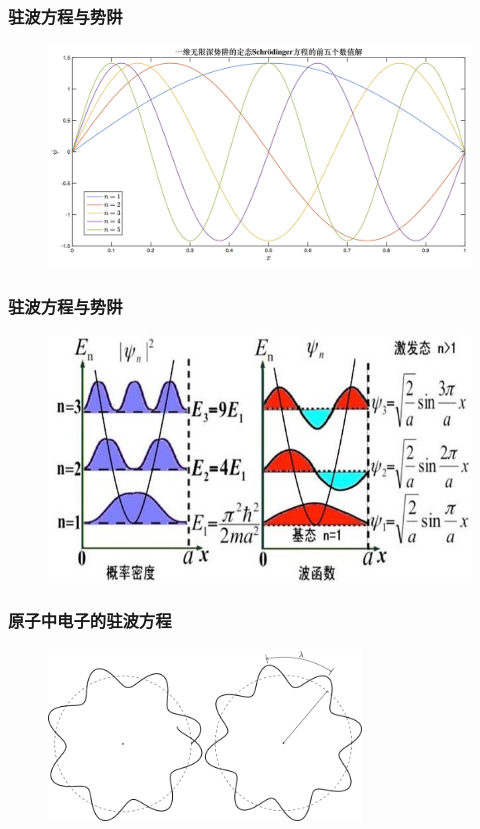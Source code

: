 \frame
{
	\frametitle{驻波方程与势阱}
\begin{figure}[h!]
\centering
\vspace{-5.5pt}
\includegraphics[height=0.55\textwidth,width=1.0\textwidth,viewport=0 0 720 400,clip]{Figures/Standing_wave-energy_1-5.jpg}
\label{Standing_Wave_2}
\end{figure}
}

\frame
{
	\frametitle{驻波方程与势阱}
\begin{figure}[h!]
\centering
\vspace{-0.5pt}
\includegraphics[height=0.46\textwidth,width=1.0\textwidth,viewport=0 0 650 390,clip]{Figures/Standing_wave_Energy.jpeg}
\label{Standing_Wave_3}
\end{figure}
}

\frame
{
	\frametitle{原子中电子的驻波方程}
\begin{figure}[h!]
	\vspace{-10.5pt}
\centering
\includegraphics[height=0.38\textwidth,width=0.74\textwidth,viewport=0 0 840 440,clip]{Figures/Standing_wave-atom.png}
\vskip 2pt
\label{Atomic-electron_Standing_wave}
\end{figure}
}

